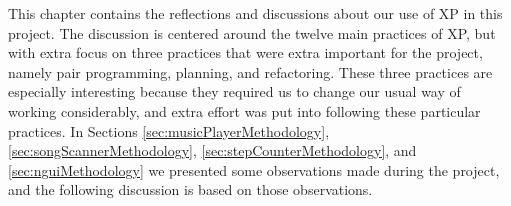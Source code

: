 This chapter contains the reflections and discussions about our use of XP in this project. The discussion is centered around the twelve main practices of XP, but with extra focus on three practices that were extra important for the project, namely pair programming, planning, and refactoring. These three practices are especially interesting because they required us to change our usual way of working considerably, and extra effort was put into following these particular practices. In Sections \ref{sec:musicPlayerMethodology}, \ref{sec:songScannerMethodology}, \ref{sec:stepCounterMethodology}, and \ref{sec:nguiMethodology} we presented some observations made during the project, and the following discussion is based on those observations.


